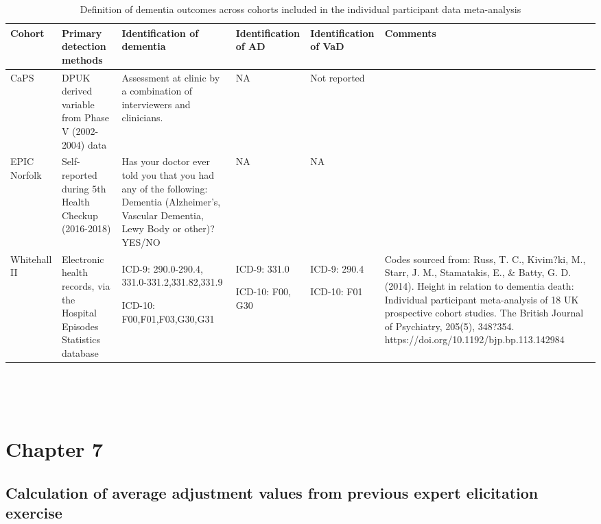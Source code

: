 \documentclass[a4paper, twoside]{templates/ociamthesis}
\begin{document}
\begin{table}[H]

\caption[Definition of dementia outcomes in IPD meta-analysis]{\label{tab:ipdDementiaDef-table}Definition of dementia outcomes across cohorts included in the individual participant data meta-analysis}
\centering
\begin{tabular}[t]{>{\raggedright\arraybackslash}p{3em}>{\raggedright\arraybackslash}p{5.8em}>{\raggedright\arraybackslash}p{5.8em}>{\raggedright\arraybackslash}p{5.8em}>{\raggedright\arraybackslash}p{5.8em}>{\raggedright\arraybackslash}p{5.8em}}
\toprule
\textbf{Cohort} & \textbf{Primary detection methods} & \textbf{Identification of dementia} & \textbf{Identification of AD} & \textbf{Identification of VaD} & \textbf{Comments}\\
\midrule
CaPS & DPUK derived variable from Phase V (2002-2004) data & Assessment at clinic by a combination of interviewers and clinicians. & NA & Not reported & \\
EPIC Norfolk & Self-reported during 5th Health Checkup (2016-2018) & Has your doctor ever told you that you had any of the following: Dementia (Alzheimer's, Vascular Dementia, Lewy Body or other)? YES/NO & NA & NA & \\
Whitehall II & Electronic health records, via the Hospital Episodes Statistics database & ICD-9: 290.0-290.4, 331.0-331.2,331.82,331.9

ICD-10: F00,F01,F03,G30,G31 & ICD-9: 331.0

ICD-10: F00, G30 & ICD-9: 290.4

ICD-10: F01 & Codes sourced from:  Russ, T. C., Kivim?ki, M., Starr, J. M., Stamatakis, E., \& Batty, G. D. (2014). Height in relation to dementia death: Individual participant meta-analysis of 18 UK prospective cohort studies. The British Journal of Psychiatry, 205(5), 348?354. https://doi.org/10.1192/bjp.bp.113.142984\\
\bottomrule
\end{tabular}
\end{table}

~

~

\hypertarget{appendix-tri-analysis}{%
\section{Chapter 7}\label{appendix-tri-analysis}}

\hypertarget{appendix-adjustment-values}{%
\subsection{Calculation of average adjustment values from previous expert elicitation exercise}\label{appendix-adjustment-values}}
\end{document}
